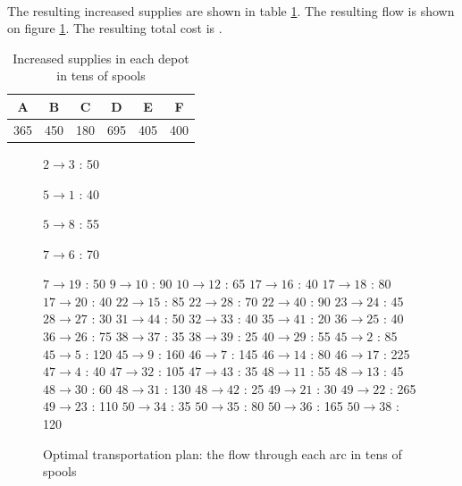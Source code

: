 \paragraph{}
The resulting increased supplies are shown in table \ref{increased-supplies}. The resulting flow is shown on figure \ref{flow3-2c}. The resulting total cost is .

\begin{table}[H]
\centering
\begin{tabular}{|c|c|c|c|c|c|}
\hline
A & B & C & D & E & F \\ \hline
365 & 450 & 180 & 695 & 405 & 400  \\ \hline
\end{tabular}
\caption{Increased supplies in each depot in tens of spools}
\label{increased-supplies}
\end{table}

\begin{figure}[H]
\centering
\begin{multicols}{5}
$ 2 \rightarrow 3 $ : 50

$ 5 \rightarrow 1 $ : 40

$ 5 \rightarrow 8 $ : 55

$ 7 \rightarrow 6 $ : 70

$ 7 \rightarrow 19 $ : 50
$ 9 \rightarrow 10 $ : 90
$ 10 \rightarrow 12 $ : 65
$ 17 \rightarrow 16 $ : 40
$ 17 \rightarrow 18 $ : 80
$ 17 \rightarrow 20 $ : 40
$ 22 \rightarrow 15 $ : 85
$ 22 \rightarrow 28 $ : 70
$ 22 \rightarrow 40 $ : 90
$ 23 \rightarrow 24 $ : 45
$ 28 \rightarrow 27 $ : 30
$ 31 \rightarrow 44 $ : 50
$ 32 \rightarrow 33 $ : 40
$ 35 \rightarrow 41 $ : 20
$ 36 \rightarrow 25 $ : 40
$ 36 \rightarrow 26 $ : 75
$ 38 \rightarrow 37 $ : 35
$ 38 \rightarrow 39 $ : 25
$ 40 \rightarrow 29 $ : 55
$ 45 \rightarrow 2 $ : 85
$ 45 \rightarrow 5 $ : 120
$ 45 \rightarrow 9 $ : 160
$ 46 \rightarrow 7 $ : 145
$ 46 \rightarrow 14 $ : 80
$ 46 \rightarrow 17 $ : 225
$ 47 \rightarrow 4 $ : 40
$ 47 \rightarrow 32 $ : 105
$ 47 \rightarrow 43 $ : 35
$ 48 \rightarrow 11 $ : 55
$ 48 \rightarrow 13 $ : 45
$ 48 \rightarrow 30 $ : 60
$ 48 \rightarrow 31 $ : 130
$ 48 \rightarrow 42 $ : 25
$ 49 \rightarrow 21 $ : 30
$ 49 \rightarrow 22 $ : 265
$ 49 \rightarrow 23 $ : 110
$ 50 \rightarrow 34 $ : 35
$ 50 \rightarrow 35 $ : 80
$ 50 \rightarrow 36 $ : 165
$ 50 \rightarrow 38 $ : 120
\end{multicols}
\caption{Optimal transportation plan: the flow through each arc in tens of spools}
\label{flow3-2c}
\end{figure}

